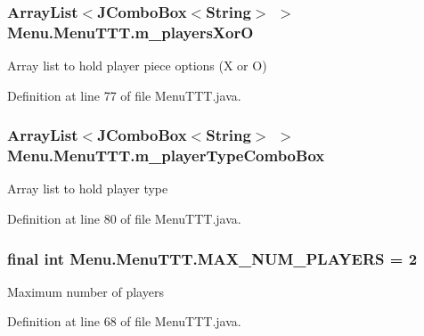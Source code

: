 \subsubsection[{m\+\_\+players\+Xor\+O}]{\setlength{\rightskip}{0pt plus 5cm}Array\+List$<$J\+Combo\+Box$<$String$>$ $>$ Menu.\+Menu\+T\+T\+T.\+m\+\_\+players\+Xor\+O\hspace{0.3cm}{\ttfamily [private]}}\label{class_menu_1_1_menu_t_t_t_a1f431306714855f214aacab632031a23}
Array list to hold player piece options (X or O) 

Definition at line 77 of file Menu\+T\+T\+T.\+java.

\hypertarget{class_menu_1_1_menu_t_t_t_a0d29323e5abc375ee10f1b27ecd6e1bd}{}
\subsubsection[{m\+\_\+player\+Type\+Combo\+Box}]{\setlength{\rightskip}{0pt plus 5cm}Array\+List$<$J\+Combo\+Box$<$String$>$ $>$ Menu.\+Menu\+T\+T\+T.\+m\+\_\+player\+Type\+Combo\+Box\hspace{0.3cm}{\ttfamily [private]}}\label{class_menu_1_1_menu_t_t_t_a0d29323e5abc375ee10f1b27ecd6e1bd}
Array list to hold player type 

Definition at line 80 of file Menu\+T\+T\+T.\+java.

\hypertarget{class_menu_1_1_menu_t_t_t_a634a62eb8c913decb22f2b27ad64e2b6}{}
\subsubsection[{M\+A\+X\+\_\+\+N\+U\+M\+\_\+\+P\+L\+A\+Y\+E\+R\+S}]{\setlength{\rightskip}{0pt plus 5cm}final int Menu.\+Menu\+T\+T\+T.\+M\+A\+X\+\_\+\+N\+U\+M\+\_\+\+P\+L\+A\+Y\+E\+R\+S = 2\hspace{0.3cm}{\ttfamily [private]}}\label{class_menu_1_1_menu_t_t_t_a634a62eb8c913decb22f2b27ad64e2b6}
Maximum number of players 

Definition at line 68 of file Menu\+T\+T\+T.\+java.



